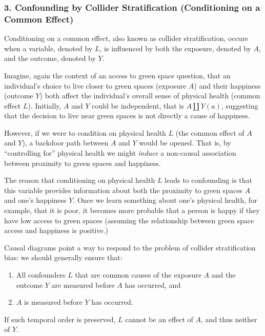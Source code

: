 \documentclass[
  singlecolumn]{article}
\begin{document}
\subsubsection{3. Confounding by Collider Stratification (Conditioning
on a Common
Effect)}\label{confounding-by-collider-stratification-conditioning-on-a-common-effect}

Conditioning on a common effect, also known as collider stratification,
occurs when a variable, denoted by \(L\), is influenced by both the
exposure, denoted by \(A\), and the outcome, denoted by \(Y\).

Imagine, again the context of an access to green space question, that an
individual's choice to live closer to green spaces (exposure \(A\)) and
their happiness (outcome \(Y\)) both affect the individual's overall
sense of physical health (common effect \(L\)). Initially, \(A\) and
\(Y\) could be independent, that is \(A \coprod Y(a)\), suggesting that
the decision to live near green spaces is not directly a cause of
happiness.

However, if we were to condition on physical health \(L\) (the common
effect of \(A\) and \(Y\)), a backdoor path between \(A\) and \(Y\)
would be opened. That is, by ``controlling for'' physical health we
might \emph{induce} a non-causal association between proximity to green
spaces and happiness.

The reason that conditioning on physical health \(L\) leads to
confounding is that this variable provides information about both the
proximity to green spaces \(A\) and one's happiness \(Y\). Once we learn
something about one's physical health, for example, that it is poor, it
becomes more probable that a person is happy if they have low access to
green spaces (assuming the relationship between green space access and
happiness is positive.)

Causal diagrams point a way to respond to the problem of collider
stratification bias: we should generally ensure that:

\begin{enumerate}
\def\labelenumi{\arabic{enumi}.}
\item
  All confounders \(L\) that are common causes of the exposure \(A\) and
  the outcome \(Y\) are measured before \(A\) has occurred, and
\item
  \(A\) is measured before \(Y\) has occurred.
\end{enumerate}

If such temporal order is preserved, \(L\) cannot be an effect of \(A\),
and thus neither of \(Y\).
\end{document}
